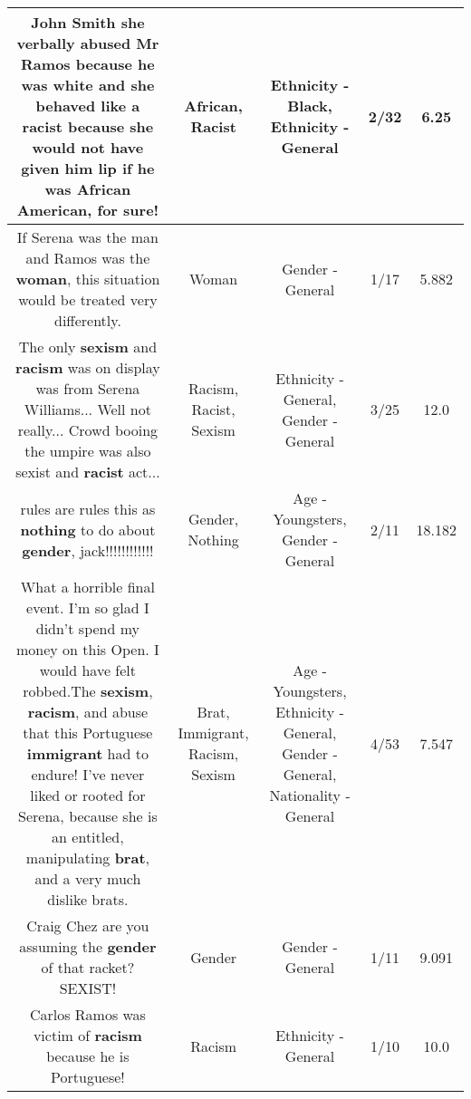 \documentclass[11pt]{article}
\newlength\mylength
\begin{document}
\begin{center}
\begin{longtable}{|C{.65\mylength}|C{.30\mylength}|C{.12\mylength}|C{.12\mylength}|C{.12\mylength}|}
  \small John Smith she verbally abused Mr Ramos because he was white and she behaved like a \textbf{racist} because she would not have given him lip if he was \textbf{African} American, for sure!\normalsize   & African, Racist & Ethnicity - Black, Ethnicity - General & 2/32 & 6.25 \\  \hline
  \small If Serena was the man and Ramos was the \textbf{woman}, this situation would be treated very differently.\normalsize   & Woman & Gender - General & 1/17 & 5.882 \\  \hline
  \small The only \textbf{sexism} and \textbf{racism} was on display was from Serena Williams... Well not really... Crowd booing the umpire was also sexist and \textbf{racist} act...\normalsize   & Racism, Racist, Sexism & Ethnicity - General, Gender - General & 3/25 & 12.0 \\  \hline
  \small rules are rules this as \textbf{nothing} to do about \textbf{gender}, jack!!!!!!!!!!!!\normalsize   & Gender, Nothing & Age - Youngsters, Gender - General & 2/11 & 18.182 \\  \hline
  \small What a horrible  final event. I'm so glad I didn't spend my money on this Open. I would have felt robbed.The \textbf{sexism}, \textbf{racism}, and abuse that this Portuguese \textbf{immigrant} had to endure! I've never liked or rooted for Serena, because she is an entitled, manipulating \textbf{brat}, and a very much dislike brats.\normalsize   & Brat, Immigrant, Racism, Sexism & Age - Youngsters, Ethnicity - General, Gender - General, Nationality - General & 4/53 & 7.547 \\  \hline
  \small Craig Chez are you assuming the \textbf{gender} of that racket? SEXIST!\normalsize   & Gender & Gender - General & 1/11 & 9.091 \\  \hline
  \small Carlos Ramos was victim of \textbf{racism} because he is Portuguese!\normalsize   & Racism & Ethnicity - General & 1/10 & 10.0 \\  \hline

\end{longtable}
\end{center}
\end{document}
